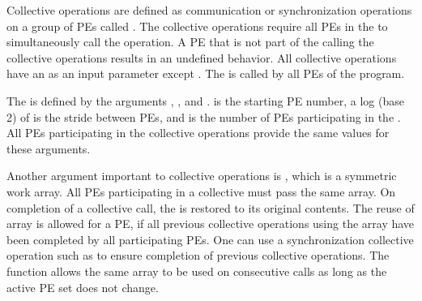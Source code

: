 
Collective operations are defined as communication or synchronization operations 
on a group of \ac{PE}s called \activeset{}. The collective operations require all
\ac{PE}s in the \activeset{} to simultaneously call the operation. 
A \ac{PE} that is not part of the \activeset{} calling the collective 
operations results in an undefined behavior.  All
collective operations have an \activeset{} as an input parameter except \barrierall{}. The \barrierall{} is called by all \ac{PE}s of the \openshmem{} program. 

The \activeset{} is defined by the arguments , , 
and .   is the starting \ac{PE} number, a log (base 2) of  is the stride between \ac{PE}s, and  is the number of \ac{PE}s participating in the \activeset{}.  All \ac{PE}s participating in the 
collective operations provide the same values for these arguments. 
 
Another argument important to collective operations is , which is a symmetric work array.  All \ac{PE}s participating in a collective must pass the same
\cbstart {} \cbend array.  On completion of a collective call, the  is restored to its 
original contents.  The reuse of  array is allowed for a \ac{PE}, if all previous collective operations using the  array \cbstart have been \cbend completed by all participating 
\ac{PE}s.  One can use a synchronization collective operation such as \barrier{}
to ensure completion of previous collective operations. \cbstart The  function allows the same  array to be used on consecutive calls as long as the active \ac{PE} set does not change. \cbend

